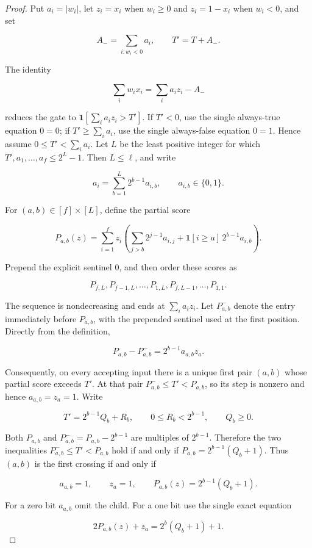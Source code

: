 \begin{proof} Put \(a_i=|w_i|\), let \(z_i=x_i\) when \(w_i\ge0\) and
\(z_i=1-x_i\) when \(w_i<0\), and set

\[
A_- = \sum_{i:w_i<0}a_i,
\qquad
T'=T+A_-.
\]

The identity

\[
\sum_iw_ix_i=\sum_i a_i z_i-A_-
\]

reduces the gate to \(\mathbf1[\sum_i a_i z_i>T']\). If \(T'<0\), use
the single always-true equation \(0=0\); if \(T'\ge\sum_i a_i\), use the
single always-false equation \(0=1\). Hence assume
\(0\le T'<\sum_i a_i\). Let \(L\) be the least positive integer for
which \(T',a_1,\ldots,a_f\le2^L-1\). Then \(L\le\ell\), and write

\[
a_i=\sum_{b=1}^L2^{b-1}a_{i,b},
\qquad a_{i,b}\in\{0,1\}.
\]

For \((a,b)\in[f]\times[L]\), define the partial score

\[
P_{a,b}(z)
={}
\sum_{i=1}^f z_i
\left(
\sum_{j>b}2^{j-1}a_{i,j}
{}+{}
\mathbf1[i\ge a]\,2^{b-1}a_{i,b}
\right).
\]

Prepend the explicit sentinel \(0\), and then order these scores as

\[
P_{f,L},P_{f-1,L},\ldots,P_{1,L},
P_{f,L-1},\ldots,P_{1,1}.
\]

The sequence is nondecreasing and ends at \(\sum_i a_i z_i\). Let
\(P^-_{a,b}\) denote the entry immediately before \(P_{a,b}\), with the
prepended sentinel used at the first position. Directly from the
definition,

\[
P_{a,b}-P^-_{a,b}=2^{b-1}a_{a,b}z_a.
\]

Consequently, on every accepting input there is a unique first pair
\((a,b)\) whose partial score exceeds \(T'\). At that pair
\(P^-_{a,b}\le T'<P_{a,b}\), so its step is nonzero and hence
\(a_{a,b}=z_a=1\). Write

\[
T'=2^{b-1}Q_b+R_b,
\qquad
0\le R_b<2^{b-1},
\qquad
Q_b\ge0.
\]

Both \(P_{a,b}\) and \(P^-_{a,b}=P_{a,b}-2^{b-1}\) are multiples of
\(2^{b-1}\). Therefore the two inequalities \(P^-_{a,b}\le T'<P_{a,b}\)
hold if and only if \(P_{a,b}=2^{b-1}(Q_b+1)\). Thus \((a,b)\) is the
first crossing if and only if

\[
a_{a,b}=1,
\qquad z_a=1,
\qquad
P_{a,b}(z)=2^{b-1}(Q_b+1).
\]

For a zero bit \(a_{a,b}\) omit the child. For a one bit use the single
exact equation

\[
2P_{a,b}(z)+z_a=2^b(Q_b+1)+1.
\]


\end{proof}
